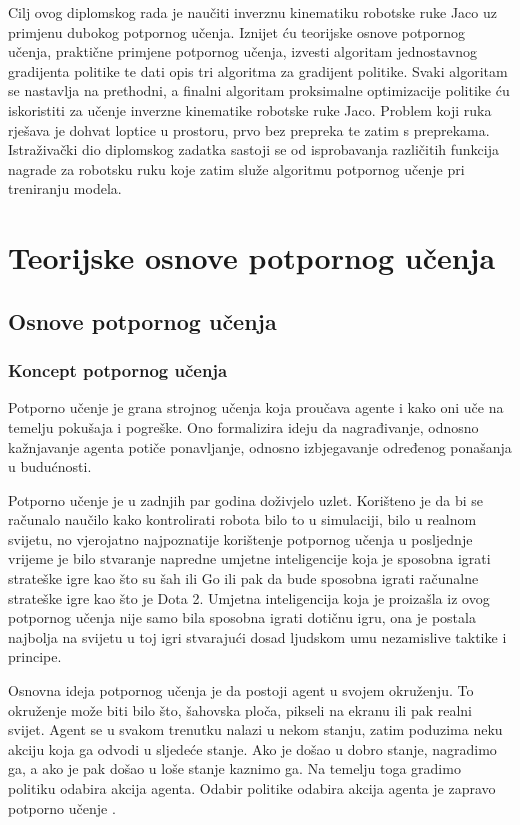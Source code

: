 \documentclass[times,utf8,diplomski]{fer}
\begin{document}
Cilj ovog diplomskog rada je naučiti inverznu kinematiku robotske ruke Jaco uz primjenu dubokog potpornog učenja. Iznijet ću teorijske osnove potpornog učenja, praktične primjene potpornog učenja, izvesti algoritam jednostavnog gradijenta politike te dati opis tri algoritma za gradijent politike. Svaki algoritam se nastavlja na prethodni, a finalni algoritam proksimalne optimizacije politike ću iskoristiti za učenje inverzne kinematike robotske ruke Jaco. Problem koji ruka rješava je dohvat loptice u prostoru, prvo bez prepreka te zatim s preprekama. Istraživački dio diplomskog zadatka sastoji se od isprobavanja različitih funkcija nagrade za robotsku ruku koje zatim služe algoritmu potpornog učenje pri treniranju modela.




\chapter{Teorijske osnove potpornog učenja}
\section{Osnove potpornog učenja}
\subsection{Koncept potpornog učenja}

Potporno učenje je grana strojnog učenja koja proučava agente i kako oni uče na temelju pokušaja i pogreške. Ono formalizira ideju da nagrađivanje, odnosno kažnjavanje agenta potiče ponavljanje, odnosno izbjegavanje određenog ponašanja u budućnosti.

Potporno učenje je u zadnjih par godina doživjelo uzlet. Korišteno je da bi se računalo naučilo kako kontrolirati robota bilo to u simulaciji, bilo u realnom svijetu, no vjerojatno najpoznatije korištenje potpornog učenja u posljednje vrijeme je bilo stvaranje napredne umjetne inteligencije koja je sposobna igrati strateške igre kao što su šah ili Go ili pak da bude sposobna igrati računalne strateške igre kao što je Dota 2. Umjetna inteligencija koja je proizašla iz ovog potpornog učenja nije samo bila sposobna igrati dotičnu igru, ona je postala najbolja na svijetu u toj igri stvarajući dosad ljudskom umu nezamislive taktike i principe.

Osnovna ideja potpornog učenja je da postoji agent u svojem okruženju. To okruženje može biti bilo što, šahovska ploča, pikseli na ekranu ili pak realni svijet. Agent se u svakom trenutku nalazi u nekom stanju, zatim poduzima neku akciju koja ga odvodi u sljedeće stanje. Ako je došao u dobro stanje, nagradimo ga, a ako je pak došao u loše stanje kaznimo ga. Na temelju toga gradimo politiku odabira akcija agenta. Odabir politike odabira akcija agenta je zapravo potporno učenje \citep{sutton}.
\end{document}
